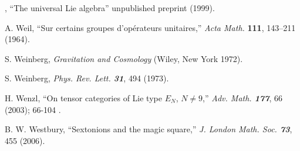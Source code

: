 ,
    ``The universal Lie algebra''
     unpublished preprint (1999).



 A. Weil,
   ``Sur certains groupes d'op\'erateurs unitaires,''
   {\em Acta Math.} {\bf 111}, 143--211 (1964).

 S. Weinberg,
    {\em Gravitation and Cosmology}
    (Wiley, New York 1972).

 S. Weinberg,
    {\em Phys. Rev. Lett.  \bf 31}, 494 (1973).


 H. Wenzl, %
    ``On tensor categories of Lie type $E_N$, $N \ne 9$,''
    {\em Adv. Math. \bf  177}, 66 (2003); 66-104
    .




 B. W. Westbury,
        ``Sextonions and the magic square,''
         {\em J. London Math. Soc. \bf 73}, 455 (2006). %


